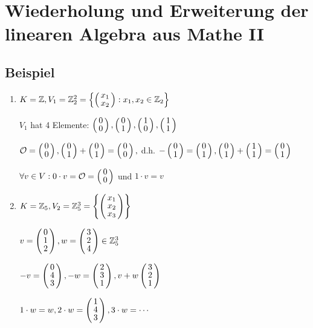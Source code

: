 \section{Wiederholung und Erweiterung der linearen Algebra aus Mathe II}
\subsection{Beispiel}

\begin{enumerate}
	\item
	$ K = \Z , V_1= \Z_2^2=\aset{
	\vct{x_1 \\ x_2} : x_1, x_2 \in \Z_2}$

	$V_1$ hat 4 Elemente: $
	\vct{0 \\0},\vct{0 \\ 1},\vct{1 \\ 0},\vct{1 \\ 1}$
	
	$\zerovec= \vct{0 \\ 0}, \vct{0 \\ 1} + \vct{0 \\ 1}= \vct{0 \\ 0},$ d.h. $-\vct{0 \\ 1} = \vct{0 \\ 1}, \vct{0 \\ 1} + \vct{1 \\ 1}=\vct{0 \\ 1}$
	 
	$\forall v \in V: 0 \cdot v = \zerovec = \vct{0 \\ 0}$ und $1\cdot v = v$
	\item
	$K = \Z_5, V_2=\Z_5^3=\aset{\vct{x_1 \\ x_2 \\ x_3}}$
	
	$v=\vct{0 \\ 1\\ 2 }, w = \vct{3 \\ 2 \\ 4} \in \Z_5^3$
	
	$-v= \vct{0 \\ 4 \\ 3}, -w = \vct{2 \\ 3 \\ 1}, v + w  \vct{3 \\ 2 \\ 1} $
	
	$1 \cdot w = w, 2 \cdot w = \vct{1 \\ 4 \\ 3}, 3 \cdot w = \cdots$
	

\end{enumerate}

